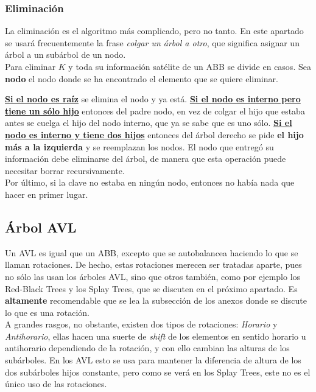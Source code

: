 \documentclass[12pt,letterpaper]{report}
\begin{document}
\subsubsection{Eliminación}
La eliminación es el algoritmo más complicado, pero no tanto. En este apartado se usará frecuentemente la frase \emph{colgar un árbol a otro}, que significa asignar un árbol a un subárbol de un nodo.\\

Para eliminar $K$ y toda su información satélite de un ABB se divide en casos. Sea \textbf{nodo} el nodo donde se ha encontrado el elemento que se quiere eliminar.

\textbf{\underline{Si el nodo es raíz}} se elimina el nodo y ya está.
\textbf{\underline{Si el nodo es interno pero tiene un sólo hijo}} entonces del padre nodo, en vez de colgar el hijo que estaba antes se cuelga el hijo del nodo interno, que ya se sabe que es uno sólo.
\textbf{\underline{Si el nodo es interno y tiene dos hijos}} entonces del árbol derecho se pide \textbf{el hijo más a la izquierda} y se reemplazan los nodos. El nodo que entregó su información debe eliminarse del árbol, de manera que esta operación puede necesitar borrar recursivamente.\\

Por último, si la clave no estaba en ningún nodo, entonces no había nada que hacer en primer lugar.

\subsection{Árbol AVL}
Un AVL es igual que un ABB, excepto que se autobalancea haciendo lo que se llaman rotaciones. De hecho, estas rotaciones merecen ser tratadas aparte, pues no sólo las usan los árboles AVL, sino que otros también, como por ejemplo los Red-Black Trees y los Splay Trees, que se discuten en el próximo apartado. Es \textbf{altamente} recomendable que se lea la subsección de los anexos donde se discute lo que es una rotación.\\

A grandes rasgos, no obstante, existen dos tipos de rotaciones: \emph{Horario} y \emph{Antihorario}, ellas hacen una suerte de \emph{shift} de los elementos en sentido horario u antihorario dependiendo de la rotación, y con ello cambian las alturas de los subárboles. En los AVL esto se usa para mantener la diferencia de altura de los dos subárboles hijos constante, pero como se verá en los Splay Trees, este no es el único uso de las rotaciones.
\end{document}
